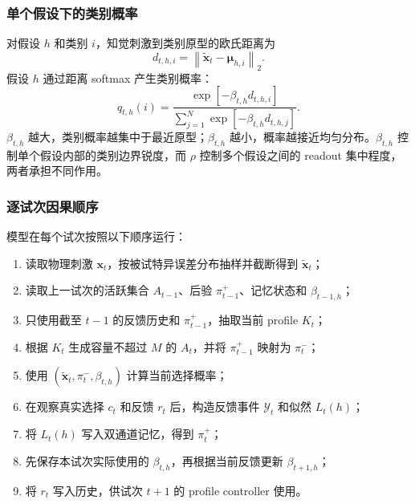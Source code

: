 \subsubsection{单个假设下的类别概率}

对假设 $h$ 和类别 $i$，知觉刺激到类别原型的欧氏距离为
\begin{equation}
    d_{t,h,i}
    =
    \left\|
        \widetilde{\mathbf x}_t-\boldsymbol\mu_{h,i}
    \right\|_2 .
    \label{eq:modelv2-prototype-distance}
\end{equation}
假设 $h$ 通过距离 softmax 产生类别概率：
\begin{equation}
    q_{t,h}(i)
    =
    \frac{
        \exp[-\beta_{t,h}d_{t,h,i}]
    }{
        \sum_{j=1}^{N}
        \exp[-\beta_{t,h}d_{t,h,j}]
    } .
    \label{eq:modelv2-category-softmax}
\end{equation}
$\beta_{t,h}$ 越大，类别概率越集中于最近原型；$\beta_{t,h}$ 越小，概率越接近均匀分布。$\beta_{t,h}$ 控制单个假设内部的类别边界锐度，而 $\rho$ 控制多个假设之间的 readout 集中程度，两者承担不同作用。


\subsubsection{逐试次因果顺序}

模型在每个试次按照以下顺序运行：
\begin{enumerate}
    \item 读取物理刺激 $\mathbf x_t$，按被试特异误差分布抽样并截断得到 $\widetilde{\mathbf x}_t$；
    \item 读取上一试次的活跃集合 $A_{t-1}$、后验 $\pi_{t-1}^+$、记忆状态和 $\beta_{t-1,h}$；
    \item 只使用截至 $t-1$ 的反馈历史和 $\pi_{t-1}^+$，抽取当前 profile $K_t$；
    \item 根据 $K_t$ 生成容量不超过 $M$ 的 $A_t$，并将 $\pi_{t-1}^+$ 映射为 $\pi_t^-$；
    \item 使用 $(\widetilde{\mathbf x}_t,\pi_t^-,\beta_{t,h})$ 计算当前选择概率；
    \item 在观察真实选择 $c_t$ 和反馈 $r_t$ 后，构造反馈事件 $\mathcal Y_t$ 和似然 $L_t(h)$；
    \item 将 $L_t(h)$ 写入双通道记忆，得到 $\pi_t^+$；
    \item 先保存本试次实际使用的 $\beta_{t,h}$，再根据当前反馈更新 $\beta_{t+1,h}$；
    \item 将 $r_t$ 写入历史，供试次 $t+1$ 的 profile controller 使用。
\end{enumerate}

